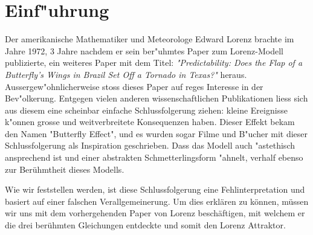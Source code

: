 
\section{Einf"uhrung}
Der amerikanische Mathematiker und Meteorologe Edward Lorenz brachte im Jahre 1972, 3 Jahre nachdem er sein ber"uhmtes Paper zum Lorenz-Modell publizierte, ein weiteres Paper mit dem Titel: \textit{"Predictability: Does the Flap of a Butterfly’s Wings in Brazil Set Off a Tornado in Texas?"} heraus. Aussergew"ohnlicherweise stoss dieses Paper auf reges Interesse in der Bev"olkerung. Entgegen vielen anderen wissenschaftlichen Publikationen liess sich aus diesem eine scheinbar einfache Schlussfolgerung ziehen: kleine Ereignisse k"onnen grosse und weitverbreitete Konsequenzen haben. Dieser Effekt bekam den Namen "Butterfly Effect", und es wurden sogar Filme und B"ucher mit dieser Schlussfolgerung als Inspiration geschrieben. Dass das Modell auch "astethisch ansprechend ist und einer abstrakten Schmetterlingsform "ahnelt, verhalf ebenso zur Berühmtheit dieses Modells. 


Wie wir feststellen werden, ist diese Schlussfolgerung eine Fehlinterpretation und basiert auf einer falschen Verallgemeinerung. Um dies erklären zu können, müssen wir uns mit dem vorhergehenden Paper von Lorenz beschäftigen, mit welchem er die drei berühmten Gleichungen entdeckte und somit den Lorenz Attraktor.
